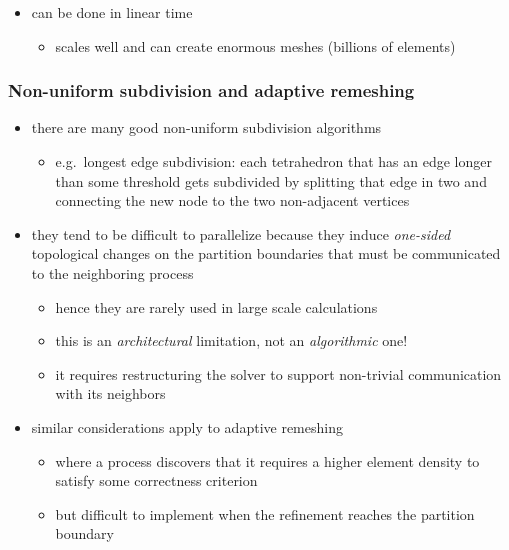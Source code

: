 \begin{frame}[fragile]
\begin{itemize}
\begin{minipage}{.35\linewidth}
  \end{minipage}
%
  \item can be done in linear time
    \begin{itemize}
    \item scales well and can create enormous meshes (billions of elements)
    \end{itemize}
%
  \end{itemize}
%
\end{frame}

\begin{frame}[fragile]
%
  \frametitle{Non-uniform subdivision and adaptive remeshing}
%
  \begin{itemize}
%
  \item there are many good non-uniform subdivision algorithms
    \begin{itemize}
    \item e.g.~longest edge subdivision: each tetrahedron that has an edge longer than some
      threshold gets subdivided by splitting that edge in two and connecting the new node to
      the two non-adjacent vertices
    \end{itemize}
%
  \item they tend to be difficult to parallelize because they induce {\em one-sided}
    topological changes on the partition boundaries that must be communicated to the
    neighboring process
    \begin{itemize}
    \item hence they are rarely used in large scale calculations
    \item this is  an {\em architectural} limitation, not an {\em algorithmic} one!
    \item it requires restructuring the solver to support non-trivial communication with its
      neighbors
    \end{itemize}
%
  \item similar considerations apply to adaptive remeshing
    \begin{itemize}
    \item where a process discovers that it requires a higher element density to satisfy some
      correctness criterion
    \item but difficult to implement when the refinement reaches the partition boundary
    \end{itemize}
%
  \end{itemize}
%
\end{frame}


